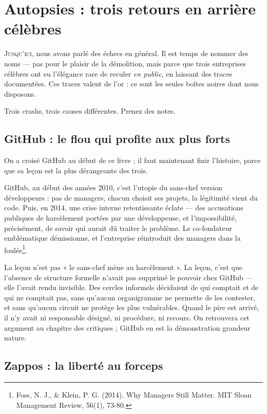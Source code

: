 
\chapter{Autopsies : trois retours en arrière célèbres}

\lettrine[lines=2]{J}{usqu'ici}, nous avons parlé des échecs en général. Il est temps de nommer des noms — pas pour le plaisir de la démolition, mais parce que trois entreprises célèbres ont eu l'élégance rare de reculer \emph{en public}, en laissant des traces documentées. Ces traces valent de l'or : ce sont les seules boîtes noires dont nous disposons.

Trois crashs, trois causes différentes. Prenez des notes.

\section{GitHub : le flou qui profite aux plus forts}

On a croisé GitHub au début de ce livre ; il faut maintenant finir l'histoire, parce que sa leçon est la plus dérangeante des trois.

GitHub, au début des années 2010, c'est l'utopie du sans-chef version développeurs : pas de managers, chacun choisit ses projets, la légitimité vient du code. Puis, en 2014, une crise interne retentissante éclate — des accusations publiques de harcèlement portées par une développeuse, et l'impossibilité, précisément, de savoir qui aurait dû traiter le problème. Le co-fondateur emblématique démissionne, et l'entreprise réintroduit des managers dans la foulée\footnote{Foss, N. J., \& Klein, P. G. (2014). Why Managers Still Matter. MIT Sloan Management Review, 56(1), 73-80.}.

La leçon n'est pas « le sans-chef mène au harcèlement ». La leçon, c'est que l'absence de structure formelle n'avait pas supprimé le pouvoir chez GitHub — elle l'avait rendu invisible. Des cercles informels décidaient de qui comptait et de qui ne comptait pas, sans qu'aucun organigramme ne permette de les contester, et sans qu'aucun circuit ne protège les plus vulnérables. Quand le pire est arrivé, il n'y avait ni responsable désigné, ni procédure, ni recours. On retrouvera cet argument au chapitre des critiques ; GitHub en est la démonstration grandeur nature.

\section{Zappos : la liberté au forceps}

